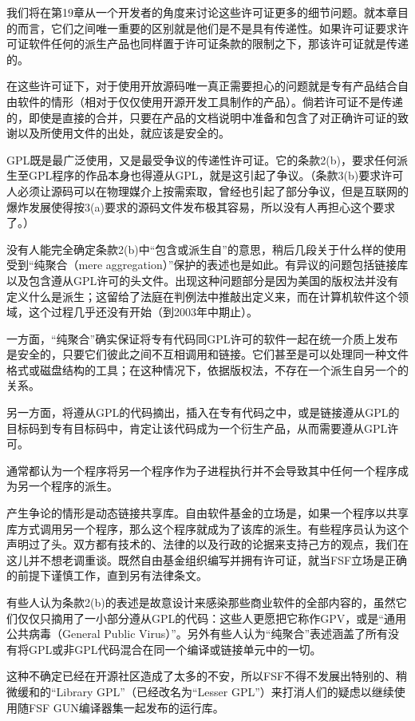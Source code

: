 \documentclass[12pt,oneside]{book}
\begin{document}
\begin{common-format}
我们将在第19章从一个开发者的角度来讨论这些许可证更多的细节问题。就本章目的而言，它们之间唯一重要的区别就是他们是不是具有传递性。如果许可证要求许可证软件任何的派生产品也同样置于许可证条款的限制之下，那该许可证就是传递的。

在这些许可证下，对于使用开放源码唯一真正需要担心的问题就是专有产品结合自由软件的情形（相对于仅仅使用开源开发工具制作的产品）。倘若许可证不是传递的，即使是直接的合并，只要在产品的文档说明中准备和包含了对正确许可证的致谢以及所使用文件的出处，就应该是安全的。

GPL既是最广泛使用，又是最受争议的传递性许可证。它的条款2(b)，要求任何派生至GPL程序的作品本身也得遵从GPL，就是这引起了争议。（条款3(b)要求许可人必须让源码可以在物理媒介上按需索取，曾经也引起了部分争议，但是互联网的爆炸发展使得按3(a)要求的源码文件发布极其容易，所以没有人再担心这个要求了。）

没有人能完全确定条款2(b)中“包含或派生自”的意思，稍后几段关于什么样的使用受到“纯聚合（mere aggregation）”保护的表述也是如此。有异议的问题包括链接库以及包含遵从GPL许可的头文件。出现这种问题部分是因为美国的版权法并没有定义什么是派生；这留给了法庭在判例法中推敲出定义来，而在计算机软件这个领域，这个过程几乎还没有开始（到2003年中期止）。

一方面，“纯聚合”确实保证将专有代码同GPL许可的软件一起在统一介质上发布是安全的，只要它们彼此之间不互相调用和链接。它们甚至是可以处理同一种文件格式或磁盘结构的工具；在这种情况下，依据版权法，不存在一个派生自另一个的关系。

另一方面，将遵从GPL的代码摘出，插入在专有代码之中，或是链接遵从GPL的目标码到专有目标码中，肯定让该代码成为一个衍生产品，从而需要遵从GPL许可。

通常都认为一个程序将另一个程序作为子进程执行并不会导致其中任何一个程序成为另一个程序的派生。

产生争论的情形是动态链接共享库。自由软件基金的立场是，如果一个程序以共享库方式调用另一个程序，那么这个程序就成为了该库的派生。有些程序员认为这个声明过了头。双方都有技术的、法律的以及行政的论据来支持己方的观点，我们在这儿并不想老调重谈。既然自由基金组织编写并拥有许可证，就当FSF立场是正确的前提下谨慎工作，直到另有法律条文。

有些人认为条款2(b)的表述是故意设计来感染那些商业软件的全部内容的，虽然它们仅仅只摘用了一小部分遵从GPL的代码：这些人更愿把它称作GPV，或是“通用公共病毒（General Public Virus）”。另外有些人认为“纯聚合”表述涵盖了所有没有将GPL或非GPL代码混合在同一个编译或链接单元中的一切。

这种不确定已经在开源社区造成了太多的不安，所以FSF不得不发展出特别的、稍微缓和的“Library GPL”（已经改名为“Lesser GPL”）来打消人们的疑虑以继续使用随FSF GUN编译器集一起发布的运行库。


\end{common-format}
\end{document}
